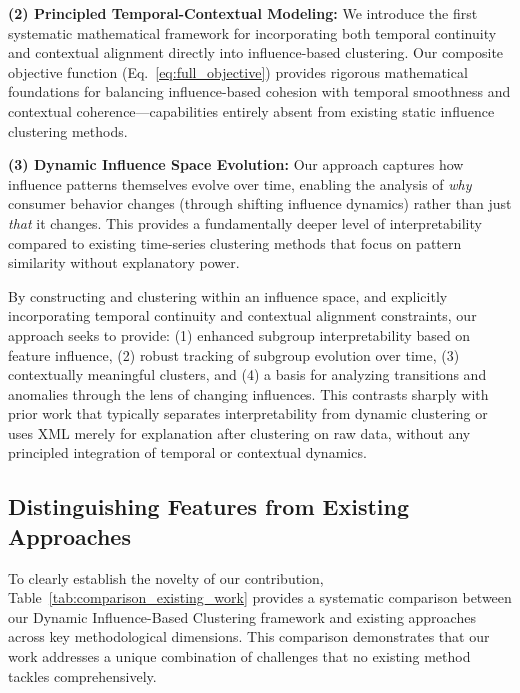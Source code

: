 \documentclass[final,authoryear,3p,times,review,sort&compress]{elsarticle}
\begin{document}
\textbf{(2) Principled Temporal-Contextual Modeling:} We introduce the first systematic mathematical framework for incorporating both temporal continuity and contextual alignment directly into influence-based clustering. Our composite objective function (Eq.~\ref{eq:full_objective}) provides rigorous mathematical foundations for balancing influence-based cohesion with temporal smoothness and contextual coherence—capabilities entirely absent from existing static influence clustering methods.

\textbf{(3) Dynamic Influence Space Evolution:} Our approach captures how influence patterns themselves evolve over time, enabling the analysis of \textit{why} consumer behavior changes (through shifting influence dynamics) rather than just \textit{that} it changes. This provides a fundamentally deeper level of interpretability compared to existing time-series clustering methods that focus on pattern similarity without explanatory power.

By constructing and clustering within an influence space, and explicitly incorporating temporal continuity and contextual alignment constraints, our approach seeks to provide: (1) enhanced subgroup interpretability based on feature influence, (2) robust tracking of subgroup evolution over time, (3) contextually meaningful clusters, and (4) a basis for analyzing transitions and anomalies through the lens of changing influences. This contrasts sharply with prior work that typically separates interpretability from dynamic clustering or uses XML merely for explanation after clustering on raw data, without any principled integration of temporal or contextual dynamics.

\subsection{Distinguishing Features from Existing Approaches}
\label{sec:distinguishing_features}

To clearly establish the novelty of our contribution, Table~\ref{tab:comparison_existing_work} provides a systematic comparison between our Dynamic Influence-Based Clustering framework and existing approaches across key methodological dimensions. This comparison demonstrates that our work addresses a unique combination of challenges that no existing method tackles comprehensively.
\end{document}
